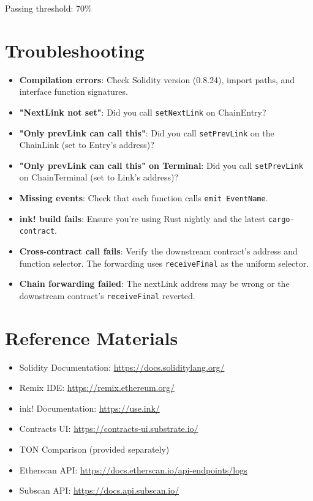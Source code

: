 \documentclass[11pt,a4paper]{article}
\begin{document}
Passing threshold: 70\%

\section{Troubleshooting}

\begin{itemize}
    \item \textbf{Compilation errors}: Check Solidity version (0.8.24),
          import paths, and interface function signatures.
    \item \textbf{"NextLink not set"}: Did you call \texttt{setNextLink} on ChainEntry?
    \item \textbf{"Only prevLink can call this"}: Did you call \texttt{setPrevLink}
          on the ChainLink (set to Entry's address)?
    \item \textbf{"Only prevLink can call this" on Terminal}: Did you call
          \texttt{setPrevLink} on ChainTerminal (set to Link's address)?
    \item \textbf{Missing events}: Check that each function calls \texttt{emit EventName}.
    \item \textbf{ink! build fails}: Ensure you're using Rust nightly and
          the latest \texttt{cargo-contract}.
    \item \textbf{Cross-contract call fails}: Verify the downstream contract's
          address and function selector. The forwarding uses \texttt{receiveFinal}
          as the uniform selector.
    \item \textbf{Chain forwarding failed}: The nextLink address may be wrong
          or the downstream contract's \texttt{receiveFinal} reverted.
\end{itemize}

\section{Reference Materials}

\begin{itemize}
    \item Solidity Documentation: \url{https://docs.soliditylang.org/}
    \item Remix IDE: \url{https://remix.ethereum.org/}
    \item ink! Documentation: \url{https://use.ink/}
    \item Contracts UI: \url{https://contracts-ui.substrate.io/}
    \item TON Comparison (provided separately)
    \item Etherscan API: \url{https://docs.etherscan.io/api-endpoints/logs}
    \item Subscan API: \url{https://docs.api.subscan.io/}
\end{itemize}
\end{document}

